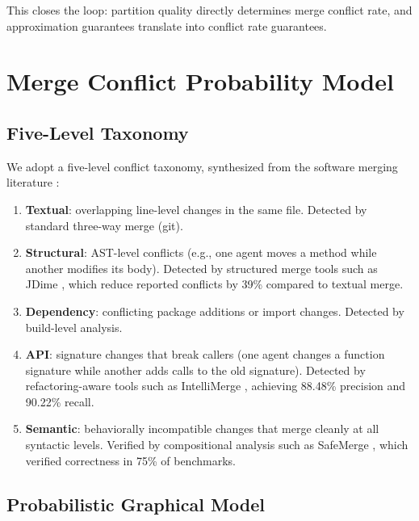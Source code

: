 \documentclass[11pt, a4paper, copyright]{googledeepmind}
\begin{document}
This closes the loop: partition quality directly determines merge conflict rate, and approximation guarantees translate into conflict rate guarantees.


\section{Merge Conflict Probability Model}
\label{sec:merge}

\subsection{Five-Level Taxonomy}

We adopt a five-level conflict taxonomy, synthesized from the software merging literature \citep{Accioly2018, Sousa2018, Falleri2014, Apel2012}:

\begin{enumerate}[nosep]
  \item \textbf{Textual}: overlapping line-level changes in the same file. Detected by standard three-way merge (git).
  \item \textbf{Structural}: AST-level conflicts (e.g., one agent moves a method while another modifies its body). Detected by structured merge tools such as JDime \citep{Apel2012}, which reduce reported conflicts by 39\% compared to textual merge.
  \item \textbf{Dependency}: conflicting package additions or import changes. Detected by build-level analysis.
  \item \textbf{API}: signature changes that break callers (one agent changes a function signature while another adds calls to the old signature). Detected by refactoring-aware tools such as IntelliMerge \citep{Shen2019}, achieving 88.48\% precision and 90.22\% recall.
  \item \textbf{Semantic}: behaviorally incompatible changes that merge cleanly at all syntactic levels. Verified by compositional analysis such as SafeMerge \citep{Sousa2018}, which verified correctness in 75\% of benchmarks.
\end{enumerate}

\subsection{Probabilistic Graphical Model}
\end{document}
